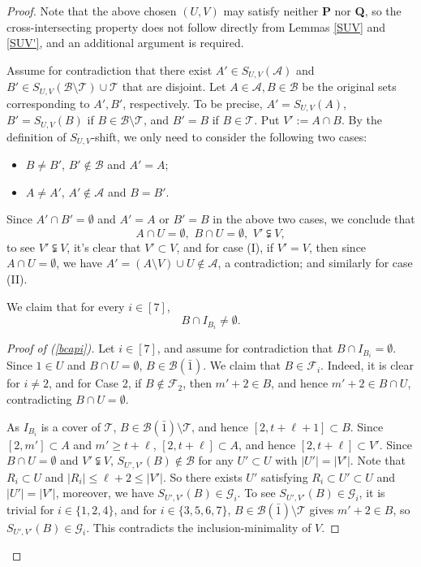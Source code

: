 \documentclass[11pt]{article}
\def\marrow{{\boldmath {\marginpar[\hfill$\rightarrow \rightarrow$]{$\leftarrow \leftarrow$}}}}
\def\andrey#1{{\sc Andrey: }{\marrow\sf \textcolor{blue}{#1}}}
\newcommand{\m}{\mathcal}
\begin{document}
\begin{proof}
Note that the above chosen $(U,V)$ may satisfy neither {\bf P} nor {\bf Q}, so the cross-intersecting property does not follow directly from Lemmas \ref{SUV} and \ref{SUV'}, and an additional argument is required. 


Assume for contradiction that there exist $A'\in S_{U,V}(\m A)$ and $B'\in S_{U,V}(\m B\setminus \m T)\cup \m T$ that are disjoint.
Let $A\in \m A, B\in \m B$ be the original sets corresponding to $A', B'$, respectively. To be precise, $A'=S_{U,V}(A)$, $B'=S_{U,V}(B)$ if $B\in \m B\setminus \m T$, and  $B'=B$ if $B\in \m T$.
Put $V':=A\cap B$. 
By the definition of $S_{U,V}$-shift,
we only need to consider the following two cases:
\begin{itemize}
    \item[(I)] $B\ne B'$, $B'\not\in \m B$ and $A'=A$; 
    \item[(II)] $A\ne A'$, $A' \not\in \m A$ and $B=B'$.
\end{itemize}
Since $A'\cap B'=\emptyset$ and $A'=A$ or $B'=B$ in the above two cases,
we conclude that 
\[
A\cap U=\emptyset, \,\,B\cap U=\emptyset, \,\, V'\subsetneqq V,
\]
to see $V'\subsetneqq V$, it's clear that $V'\subset V$, and for case (I), if $V'=V$, then since $A\cap U=\emptyset$, we have $A'=(A\setminus V)\cup U\not\in \m A$, a contradiction; and similarly for case (II).

We claim that for every $i\in [7]$, 
\begin{equation}\label{bcapi}
   B\cap I_{B_i}\ne \emptyset.
\end{equation}
\begin{proof}[Proof of (\ref{bcapi})]
Let $i\in [7]$, and assume for contradiction that $B\cap I_{B_i}= \emptyset$. 
Since $1\in U$ and $B\cap U=\emptyset$, $B\in \m B(\bar1)$.
We claim that $B\in \m F_i$. Indeed, it is clear for $i\ne 2$, and for Case 2, if $B\not\in \m F_2$, then $m'+2\in B$, and hence $m'+2\in B\cap U$, contradicting $B\cap U=\emptyset$.

As $I_{B_i}$ is a cover of $\m T$, $B\in \m B(\bar1)\setminus \m T$, and hence $[2,t+\ell +1]\subset B$. 
Since $[2,m']\subset A$ and $m'\ge t+\ell$, 
$[2,t+\ell]\subset A$, and hence $[2,t+\ell]\subset V'$.
Since $B\cap U=\emptyset$ and $V'\subsetneqq V$, $S_{U',V'}(B)\not\in \m B$ for any $U'\subset U$ with $|U'|=|V'|$. Note that $R_i\subset U$ and $|R_i|\le \ell+2\le |V'|$. 
So there exists $U'$ satisfying $R_i\subset U'\subset U$ and $|U'|=|V'|$, moreover, we have $S_{U',V'}(B)\in \m G_i$. To see $S_{U',V'}(B)\in \m G_i$, it is trivial for $i\in \{1,2,4\}$, and for $i\in \{3,5,6,7\}$, $B\in \m B(\bar1)\setminus \m T$ gives $m'+2\in B$, so $S_{U',V'}(B)\in \m G_i$. This contradicts the inclusion-minimality of $V$.   
\end{proof}


\end{proof}
\end{document}
